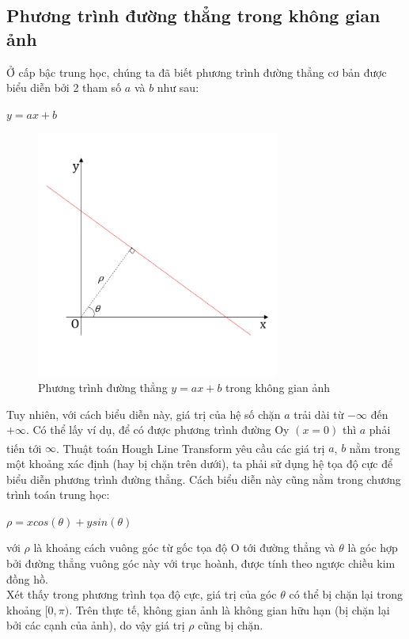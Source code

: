 \subsection{Phương trình đường thẳng trong không gian ảnh}
\tab Ở cấp bậc trung học, chúng ta đã biết phương trình đường thẳng cơ bản được biểu diễn bởi 2 tham số $a$ và $b$ như sau:
\begin{center}
$y = ax + b$    
\end{center}
\begin{figure}[htp]
\begin{center}
    \includegraphics[width=8cm]{img/2_Theory/hough_trans_1.png}
    \caption{Phương trình đường thẳng $y = ax + b$ trong không gian ảnh}
\end{center}
\end{figure}
\tab Tuy nhiên, với cách biểu diễn này, giá trị của hệ số chặn $a$ trải dài từ $-\infty$ đến $+\infty$. Có thể lấy ví dụ, để có được phương trình đường Oy $(x = 0)$ thì $a$ phải tiến tới $\infty$. Thuật toán Hough  Line Transform\textsuperscript{\cite{houghtransform}} yêu cầu các giá trị $a$, $b$ nằm trong một khoảng xác định (hay bị chặn trên dưới), ta phải sử dụng hệ tọa độ cực để biểu diễn phương trình đường thẳng. Cách biểu diễn này cũng nằm trong chương trình toán trung học:
\begin{center}
$\rho = xcos(\theta) + ysin(\theta)$    
\end{center}
với $\rho$ là khoảng cách vuông góc từ gốc tọa độ O tới đường thẳng và $\theta$ là góc hợp bởi đường thẳng vuông góc này với trục hoành, được tính theo ngược chiều kim đồng hồ.\\
\tab Xét thấy trong phương trình tọa độ cực, giá trị của góc $\theta$ có thể bị chặn lại trong khoảng $[0, \pi)$. Trên thực tế, không gian ảnh là không gian hữu hạn (bị chặn lại bởi các cạnh của ảnh), do vậy giá trị $\rho$ cũng bị chặn.
